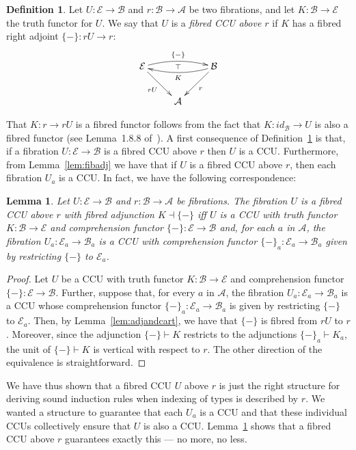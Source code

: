 \documentclass{LMCS}
\newcommand{\ra}{\rightarrow}
\newcommand\E{{\mathcal E}}
\newcommand\B{{\mathcal B}}
\newcommand\A{{\mathcal A}}
\theoremstyle{plain}
\newtheorem{lemma}[theorem]{Lemma}
\theoremstyle{remark}
\theoremstyle{definition}
\newtheorem{definition}[theorem]{Definition}
\begin{document}
\begin{definition}\label{def:ccua}
  Let $U:\E\to\B$ and $r:\B\to\A$ be two fibrations, and let
  $K:\B\to\E$ the truth functor for $U$. We say that $U$ is a
  \emph{fibred CCU above $r$} if $K$ has a fibred right adjoint
  $\{-\}:r U\to r$: \[\xymatrix{ \E\ar[dr]_{r U} \ar@/^/[rr]^{\{-\}}
    \ar@{}[rr]|\top & & \ar@/^/[ll]^K \ar[ld]^r \B\\ & \A & }\]
\end{definition}
\noindent
That $K:r \ra rU$ is a fibred functor follows from the fact that $K:
id_\B \ra U$ is also a fibred functor (see Lemma~1.8.8
of~\cite{jac99}). A first consequence of Definition~\ref{def:ccua} is
that, if a fibration $U:\E\to\B$ is a fibred CCU above $r$ then $U$ is
a CCU. Furthermore, from Lemma~\ref{lem:fibadj} we have that if $U$
is a fibred CCU above $r$, then each fibration $U_a$ is a CCU. In
fact, we have the following correspondence: 

\begin{lemma}\label{lem:ccuafibadj}
  Let $U:\E\to\B$ and $r:\B\to\A$ be fibrations. The fibration $U$ is
  a fibred CCU above $r$ with fibred adjunction $K \dashv \{-\}$ iff
  $U$ is a CCU with truth functor $K:\B\to\E$ and comprehension
  functor $\{-\}:\E\to\B$ and, for each $a$ in $\A$, the fibration
  $U_a:\E_a\to\B_a$ is a CCU with comprehension functor
  $\{-\}_a:\E_a\to\B_a$ given by restricting $\{-\}$ to $\E_a$.
\end{lemma}

\begin{proof}
  Let $U$ be a CCU with truth functor $K:\B\to\E$ and comprehension
  functor $\{-\}:\E\to\B$.  Further, suppose that, for every $a$ in
  $\A$, the fibration $U_a:\E_a\to\B_a$ is a CCU whose comprehension
  functor $\{-\}_a:\E_a\to\B_a$ is given by restricting $\{-\}$ to
  $\E_a$.  Then, by Lemma~\ref{lem:adjandcart}, we have that $\{-\}$
  is fibred from $r U$ to $r$. Moreover, since the adjunction
  $\{-\}\vdash K$ restricts to the adjunctions $\{-\}_a\vdash K_a$,
  the unit of $\{-\}\vdash K$ is vertical with respect to $r$.  The
  other direction of the equivalence is straightforward.
\end{proof}

\noindent
We have thus shown that a fibred CCU $U$ above $r$ is just the right
structure for deriving sound induction rules when indexing of types is
described by $r$. We wanted a structure to guarantee that each $U_a$
is a CCU and that these individual CCUs collectively ensure that $U$
is also a CCU. Lemma~\ref{lem:ccuafibadj} shows that a fibred CCU
above $r$ guarantees exactly this --- no more, no less.
\end{document}
